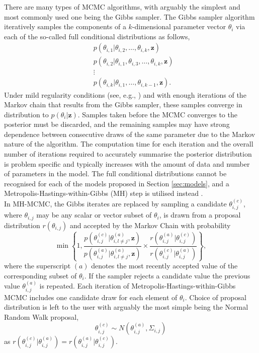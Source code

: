 \documentclass[12pt,a4paper]{article}\usepackage[]{graphicx}\usepackage[]{color}
\begin{document}
There are many types of MCMC algorithms, with arguably the simplest and most commonly used one being the Gibbs sampler. The Gibbs sampler algorithm iteratively samples the components of a $k$-dimensional parameter vector $\theta_i$ via each of the so-called full conditional distributions as follows,
\begin{align}
&p(\theta_{i, 1} | \theta_{i, 2}, \dots, \theta_{i, k}, \textbf{z}) \nonumber \\
&p(\theta_{i, 2} | \theta_{i, 1}, \theta_{i, 3}, \dots, \theta_{i, k}, \textbf{z}) \nonumber \\
&\vdots \nonumber \\
&p(\theta_{i, k} | \theta_{i, 1}, \dots, \theta_{i, k-1}, \textbf{z}). \nonumber
\end{align}
Under mild regularity conditions (see, e.g., \citet{Tierney1994}) and with enough iterations of the Markov chain that results from the Gibbs sampler, these samples converge in distribution to $p(\theta_i | \textbf{z})$. Samples taken before the MCMC converges to the posterior must be discarded, and the remaining samples may have strong dependence between consecutive draws of the same parameter due to the Markov nature of the algorithm. The computation time for each iteration and the overall number of iterations required to accurately summarise the posterior distribution is problem specific and typically increases with the amount of data and number of parameters in the model. The full conditional distributions cannot be recognised for each of the models proposed in Section \ref{sec:models}, and a Metropolis-Hastings-within-Gibbs (MH) step is utilised instead \citep{Gilks1995}.
\\

In MH-MCMC, the Gibbs iterates are replaced by sampling a candidate $\theta_{i, j}^{(c)}$, where $\theta_{i, j}$ may be any scalar or vector subset of $\theta_i$, is drawn from a proposal distribution $r(\theta_{i, j})$ and accepted by the Markov Chain with probability
\begin{equation}
\min \left\{ 1, \frac{p(\theta_{i, j}^{(c)} | \theta_{i, l \neq j}^{(a)}, \textbf{z})}{p(\theta_{i, j}^{(a)} | \theta_{i, l \neq j}^{(a)}, \textbf{z})} \times \frac{r(\theta_{i, j}^{(a)} | \theta_{i, j}^{(c)})}{r(\theta_{i, j}^{(c)} | \theta_{i, j}^{(a)})} \right\},
\label{MHaccept}
\end{equation}
where the superscript $(a)$ denotes the most recently accepted value of the corresponding subset of $\theta_i$. If the sampler rejects a candidate value the previous value $\theta_{i, j}^{(a)}$ is repeated. Each iteration of Metropolis-Hastings-within-Gibbs MCMC includes one candidate draw for each element of $\theta_i$. Choice of proposal distribution is left to the user with arguably the most simple being the Normal Random Walk proposal,
\begin{equation}
\theta_{i, j}^{(c)} \sim N(\theta_{i, j}^{(a)}, \Sigma_{i, j})
\label{RWprop}
\end{equation}
as $r(\theta_{i, j}^{(c)} | \theta_{i, j}^{(a)}) = r(\theta_{i, j}^{(a)} | \theta_{i, j}^{(c)})$.
\\
\end{document}
